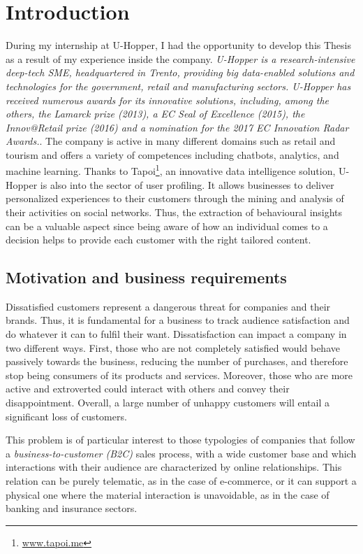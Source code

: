 \chapter{Introduction}
\label{cha:introduction}

During my internship at U-Hopper, I had the opportunity to develop this Thesis as a result of my experience inside the company. 
\textit{ U-Hopper is a research-intensive deep-tech SME, headquartered in Trento, providing big data-enabled solutions and technologies for the government, retail and manufacturing sectors. U-Hopper has received numerous awards for its innovative solutions, including, among the others, the Lamarck prize (2013), a EC Seal of Excellence (2015), the Innov@Retail prize (2016) and a nomination for the 2017 EC Innovation Radar Awards.}.
The company is active in many different domains such as retail and tourism and offers a variety of competences including chatbots, analytics, and machine learning.
Thanks to Tapoi\footnote{\url{www.tapoi.me}}, an innovative data intelligence solution, U-Hopper is also into the sector of user profiling.
It allows businesses to deliver personalized experiences to their customers through the mining and analysis of their activities on social networks.
Thus, the extraction of behavioural insights can be a valuable aspect since being aware of how an individual comes to a decision helps to provide each customer with the right tailored content.


\section{Motivation and business requirements}
Dissatisfied customers represent a dangerous threat for companies and their brands. Thus, it is fundamental for a business to track audience satisfaction and do whatever it can to fulfil their want.
Dissatisfaction can impact a company in two different ways. 
First, those who are not completely satisfied would behave passively towards the business, reducing the number of purchases, and therefore stop being consumers of its products and services.
Moreover, those who are more active and extroverted could interact with others and convey their disappointment.
Overall, a large number of unhappy customers will entail a significant loss of customers.

This problem is of particular interest to those typologies of companies that follow a \emph{business-to-customer (B2C)} sales process,
with a wide customer base and which interactions with their audience are characterized by online relationships.
This relation can be purely telematic, as in the case of e-commerce, or it can support a physical one where the material interaction is unavoidable, as in the case of banking and insurance sectors.

